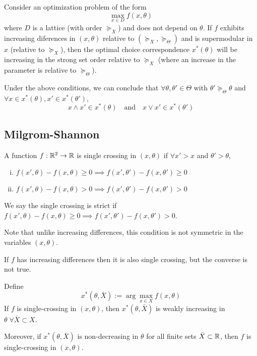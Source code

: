 \begin{theorem}[Topkis]
  Consider an optimization problem of the form
  \[
  \max_{x \in D} f(x, \theta)
  \]
  where $D$ is a lattice (with order $\succeq_X$) and does not depend
  on $\theta$. If $f$ exhibits increasing diferences in $(x,\theta)$
  relative to $(\succeq_X, \succeq_\Theta)$ and is supermodular in $x$
  (relative to $\succeq_X$), then the optimal choice correspondence
  $x^*(\theta)$ will be increasing in the strong set order relative to
  $\succeq_X$ (where an increase in the parameter is relative to
  $\succeq_\Theta$).

  Under the above conditions, we can conclude that $\forall \theta,
  \theta' \in \Theta$ with $\theta' \succeq_\Theta \theta$ and
  $\forall x \in x^*(\theta), x' \in x^*(\theta')$,
  \[
  x \wedge x' \in x^*(\theta) \quad \text{and} \quad x \vee x' \in x^*(\theta')
  \]
\end{theorem}


\subsection{Milgrom-Shannon}
\label{sec:milgrom-shannon}

\begin{definition}
  A function $f: {\mathbb R}^2 \to {\mathbb R}$ is single crossing in $(x, \theta)$ if
  $\forall x' > x$ and $\theta' > \theta$,
  \begin{enumerate}[(i)]
  \item $f(x', \theta) - f(x, \theta) \geq 0 \implies f(x', \theta') -
    f(x, \theta') \geq 0$
  \item $f(x', \theta) - f(x, \theta) > 0 \implies f(x', \theta') -
    f(x, \theta') > 0$
  \end{enumerate}

  We say the single crossing is strict if $f(x', \theta) - f(x,
  \theta) \geq 0 \implies f(x', \theta') - f(x, \theta') > 0$.
\end{definition}

Note that unlike increasing differences, this condition is not
symmetric in the variables $(x, \theta)$.

\begin{prop}
  If $f$ has increasing differences then it is also single crossing,
  but the converse is not true.
\end{prop}

\begin{prop}
  Define
  \[
  x^*(\theta, \bar X) := \arg \max_{x \in X} f(x, \theta)
  \]
  If $f$ is single-crossing in $(x, \theta)$, then $x^*(\theta, \bar
  X)$ is weakly increasing in $\theta \; \forall \bar X \subset X$.

  Moreover, if $x^*(\theta, \bar X)$ is non-decreasing in $\theta$ for
  all finite sets $\bar X \subset {\mathbb R}$, then $f$ is single-crossing in
  $(x, \theta)$.
\end{prop}

